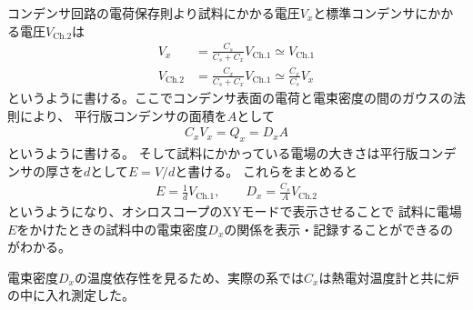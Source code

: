 \documentclass[11pt,dvipdfmx,a4paper]{jsarticle}
\begin{document}
コンデンサ回路の電荷保存則より試料にかかる電圧\(V_x\)と標準コンデンサにかかる電圧\(V_{\text{Ch.2}}\)は
\begin{align}
    V_x &= \frac{C_s}{C_s+C_x}V_{\text{Ch.1}} \simeq V_{\text{Ch.1}}\\
    V_{\text{Ch.2}} &= \frac{C_x}{C_s+C_x}V_{\text{Ch.1}} \simeq \frac{C_x}{C_s}V_x
\end{align}
というように書ける。ここでコンデンサ表面の電荷と電束密度の間のガウスの法則により、
平行版コンデンサの面積を\(A\)として
\begin{align}
    C_x V_x = Q_x = D_x A
\end{align}
というように書ける。
そして試料にかかっている電場の大きさは平行版コンデンサの厚さを\(d\)として\(E = V/d\)と書ける。
これらをまとめると
\begin{align}
    E = \frac{1}{d}V_{\text{Ch.1}}, \qquad
    D_x = \frac{C_s}{A}V_{\text{Ch.2}}
\end{align}
というようになり、オシロスコープのXYモードで表示させることで
試料に電場\(E\)をかけたときの試料中の電束密度\(D_x\)の関係を表示・記録することができるのがわかる。

電束密度\(D_x\)の温度依存性を見るため、実際の系では\(C_x\)は熱電対温度計と共に炉の中に入れ測定した。
\end{document}
